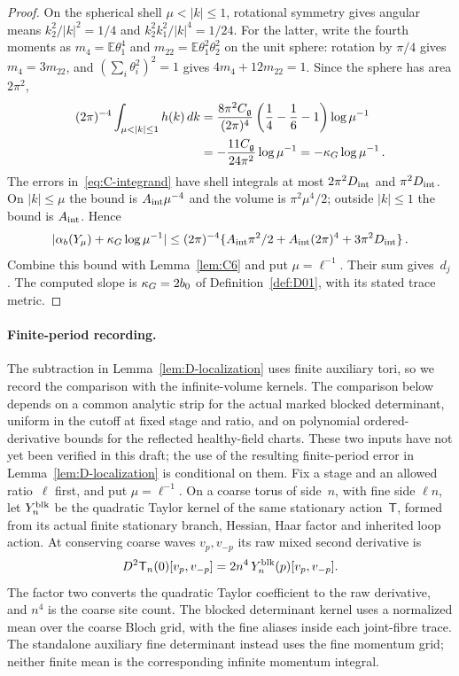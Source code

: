 \begin{proof}
On the spherical shell $\mu<|k|\le1$, rotational symmetry gives angular means $k_2^2/|k|^2=1/4$ and $k_2^2k_1^2/|k|^4=1/24$. For the latter, write the fourth moments as $m_4=\mathbb E\theta_1^4$ and $m_{22}=\mathbb E\theta_1^2\theta_2^2$ on the unit sphere: rotation by $\pi/4$ gives $m_4=3m_{22}$, and $(\sum_i\theta_i^2)^2=1$ gives $4m_4+12m_{22}=1$. Since the sphere has area $2\pi^2$,
\begin{align}\label{eq:C-slope}
(2\pi)^{-4}\int_{\mu<|k|\le1}h(k)\,dk
&=\frac{8\pi^2\casimir}{(2\pi)^4}\left(\frac14-\frac16-1\right)\log\mu^{-1}\\
&=-\frac{11\casimir}{24\pi^2}\log\mu^{-1}=-\slope\log\mu^{-1}\,.\notag
\end{align}
The errors in~\eqref{eq:C-integrand} have shell integrals at most $2\pi^2D_{\rm int}$ and $\pi^2D_{\rm int}$. On $|k|\le\mu$ the bound is $A_{\rm int}\mu^{-4}$ and the volume is $\pi^2\mu^4/2$; outside $|k|\le1$ the bound is $A_{\rm int}$. Hence
\begin{equation*}
|\alpha_b(Y_\mu)+\kappa_G\log\mu^{-1}|
\le(2\pi)^{-4}\{A_{\rm int}\pi^2/2+A_{\rm int}(2\pi)^4+3\pi^2D_{\rm int}\}\,.
\end{equation*}
Combine this bound with Lemma~\ref{lem:C6} and put $\mu=\ell^{-1}$. Their sum gives~$d_j$. The computed slope is $\kappa_G=2b_0$ of Definition~\ref{def:D01}, with its stated trace metric.
\end{proof}

\paragraph{Finite-period recording.}\label{par:C-finite-period} The subtraction in Lemma~\ref{lem:D-localization} uses finite auxiliary tori, so we record the comparison with the infinite-volume kernels. The comparison below depends on a common analytic strip for the actual marked blocked determinant, uniform in the cutoff at fixed stage and ratio, and on polynomial ordered-derivative bounds for the reflected healthy-field charts. These two inputs have not yet been verified in this draft; the use of the resulting finite-period error in Lemma~\ref{lem:D-localization} is conditional on them. Fix a stage and an allowed ratio~$\ell$ first, and put $\mu=\ell^{-1}$. On a coarse torus of side~$n$, with fine side $\ell n$, let $Y^{\rm blk}_{n}$ be the quadratic Taylor kernel of the same stationary action~$\mathsf T$, formed from its actual finite stationary branch, Hessian, Haar factor and inherited loop action. At conserving coarse waves $v_p,v_{-p}$ its raw mixed second derivative is
\begin{equation*}
D^2\mathsf T_n(0)[v_p,v_{-p}]=2n^4\,Y^{\rm blk}_{n}(p)[v_p,v_{-p}].
\end{equation*}
The factor two converts the quadratic Taylor coefficient to the raw derivative, and $n^4$ is the coarse site count. The blocked determinant kernel uses a normalized mean over the coarse Bloch grid, with the fine aliases inside each joint-fibre trace. The standalone auxiliary fine determinant instead uses the fine momentum grid; neither finite mean is the corresponding infinite momentum integral.

